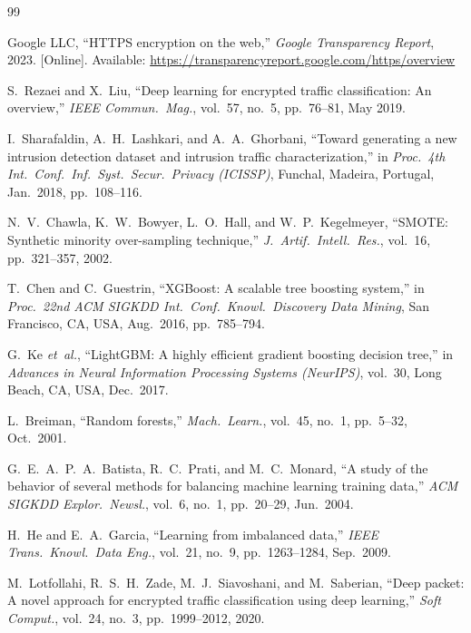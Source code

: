 \documentclass[conference]{IEEEtran}
\begin{document}
\begin{thebibliography}{99}

Google LLC, ``HTTPS encryption on the web,''
\textit{Google Transparency Report}, 2023. [Online]. Available:
\url{https://transparencyreport.google.com/https/overview}

S.~Rezaei and X.~Liu,
``Deep learning for encrypted traffic classification: An overview,''
\textit{IEEE Commun.\ Mag.}, vol.~57, no.~5, pp.~76--81, May 2019.

I.~Sharafaldin, A.~H.~Lashkari, and A.~A.~Ghorbani,
``Toward generating a new intrusion detection dataset and intrusion traffic
characterization,''
in \textit{Proc.\ 4th Int.\ Conf.\ Inf.\ Syst.\ Secur.\ Privacy (ICISSP)},
Funchal, Madeira, Portugal, Jan.\ 2018, pp.~108--116.

N.~V.~Chawla, K.~W.~Bowyer, L.~O.~Hall, and W.~P.~Kegelmeyer,
``SMOTE: Synthetic minority over-sampling technique,''
\textit{J.\ Artif.\ Intell.\ Res.}, vol.~16, pp.~321--357, 2002.

T.~Chen and C.~Guestrin,
``XGBoost: A scalable tree boosting system,''
in \textit{Proc.\ 22nd ACM SIGKDD Int.\ Conf.\ Knowl.\ Discovery Data
Mining}, San Francisco, CA, USA, Aug.\ 2016, pp.~785--794.

G.~Ke \textit{et~al.},
``LightGBM: A highly efficient gradient boosting decision tree,''
in \textit{Advances in Neural Information Processing Systems (NeurIPS)},
vol.~30, Long Beach, CA, USA, Dec.\ 2017.

L.~Breiman,
``Random forests,''
\textit{Mach.\ Learn.}, vol.~45, no.~1, pp.~5--32, Oct.\ 2001.

G.~E.~A.~P.~A.~Batista, R.~C.~Prati, and M.~C.~Monard,
``A study of the behavior of several methods for balancing machine learning
training data,''
\textit{ACM SIGKDD Explor.\ Newsl.}, vol.~6, no.~1, pp.~20--29, Jun.\ 2004.

H.~He and E.~A.~Garcia,
``Learning from imbalanced data,''
\textit{IEEE Trans.\ Knowl.\ Data Eng.}, vol.~21, no.~9,
pp.~1263--1284, Sep.\ 2009.

M.~Lotfollahi, R.~S.~H.~Zade, M.~J.~Siavoshani, and M.~Saberian,
``Deep packet: A novel approach for encrypted traffic classification using
deep learning,''
\textit{Soft Comput.}, vol.~24, no.~3, pp.~1999--2012, 2020.


\end{thebibliography}
\end{document}
